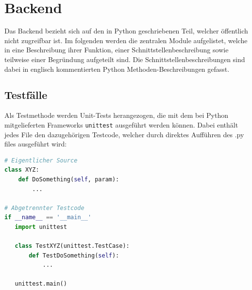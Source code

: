 \chapter{Backend}
\label{cha:backend}
Das Backend bezieht sich auf den in Python geschriebenen Teil, welcher
öffentlich nicht zugreifbar ist.
Im folgenden werden die zentralen Module aufgelistet, welche in eine
Beschreibung ihrer Funktion, einer Schnittstellenbeschreibung sowie
teilweise einer Begründung aufgeteilt sind.
Die Schnittstellenbeschreibungen sind dabei in englisch kommentierten Python Methoden-Beschreibungen gefasst. 

\section{Testfälle}
Als Testmethode werden Unit-Tests herangezogen, die mit dem bei Python mitgelieferten Frameworks \texttt{unittest}
ausgeführt werden können. Dabei enthält jedes File den dazugehörigen Testcode, welcher durch direktes Aufführen des
.py files ausgeführt wird:

\begin{lstlisting}[language=Python]
# Eigentlicher Source
class XYZ:
    def DoSomething(self, param):
        ...

# Abgetrennter Testcode
if __name__ == '__main__'
   import unittest

   class TestXYZ(unittest.TestCase):
       def TestDoSomething(self):
           ...

   unittest.main()
\end{lstlisting}


\newpage
